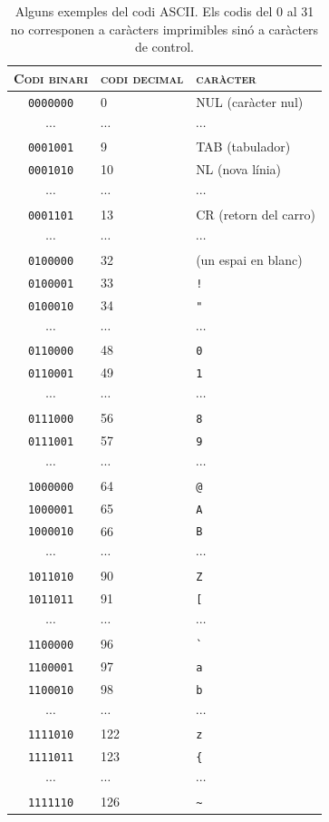 \begin{table}
\begin{center}
\begin{tabular}{c|l|l}
\hline\hline \textsc{Codi binari} & \textsc{codi decimal} &
\textsc{caràcter} \\
\hline
\texttt{0000000} & 0 & NUL (caràcter nul)  \\
$\cdots$ & $\cdots$ & $\cdots$ \\
\texttt{0001001} & 9 & TAB (tabulador) \\
\texttt{0001010} & 10 & NL (nova línia) \\
$\cdots$ & $\cdots$ & $\cdots$ \\
\texttt{0001101} & 13 & CR (retorn del carro) \\
$\cdots$ & $\cdots$ & $\cdots$ \\
\texttt{0100000} & 32 & (un espai en blanc) \\
\texttt{0100001} & 33 & \texttt{!} \\
\texttt{0100010} & 34 & \verb+"+ \\
$\cdots$ & $\cdots$ & $\cdots$ \\
\texttt{0110000} & 48 & \texttt{0} \\
\texttt{0110001} & 49 & \texttt{1} \\
$\cdots$ & $\cdots$ & $\cdots$ \\
\texttt{0111000} & 56 & \texttt{8} \\
\texttt{0111001} & 57 & \texttt{9} \\
$\cdots$ & $\cdots$ & $\cdots$ \\
\texttt{1000000} & 64 & \texttt{@} \\
\texttt{1000001} & 65 & \texttt{A} \\
\texttt{1000010} & 66 & \texttt{B} \\
$\cdots$ & $\cdots$ & $\cdots$ \\
\texttt{1011010} & 90 & \texttt{Z} \\
\texttt{1011011} & 91 & \texttt{[} \\
$\cdots$ & $\cdots$ & $\cdots$ \\
\texttt{1100000} & 96 & \verb+`+ \\
\texttt{1100001} & 97 & \texttt{a} \\
\texttt{1100010} & 98 & \texttt{b} \\
$\cdots$ & $\cdots$ & $\cdots$ \\
\texttt{1111010} & 122 & \texttt{z} \\
\texttt{1111011} & 123 & \verb+{+ \\
$\cdots$ & $\cdots$ & $\cdots$ \\
\texttt{1111110} & 126 & \verb+~+ \\
\end{tabular}
\end{center}
\caption{Alguns exemples del codi ASCII. Els codis del 0 al 31 no
  corresponen a caràcters imprimibles sinó a caràcters de control.}
\label{tb:ASCII}
\end{table}

